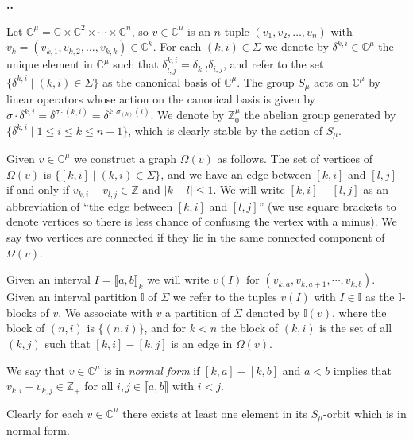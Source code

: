 \documentclass[11pt,fleqn]{amsart}
\renewcommand\thesection{\arabic{section}}
\newcounter{para}[section]
\renewcommand\thepara{\thesection.\arabic{para}}
\def\paragraph{%
 \noindent
 \refstepcounter{para}%
 \textbf{\thepara.}\hspace{1ex}%
}
\newcommand\CC{\mathbb C}
\newcommand\ZZ{\mathbb Z}
\newcommand\II{\mathbb I}
\newcommand\interval[1]{\llbracket #1 \rrbracket}
\newcommand\abs[1]{|#1|}
\begin{document}
\paragraph
Let $\CC^\mu = \CC \times \CC^2 \times \cdots \times \CC^n$, so $v \in \CC^\mu$
is an $n$-tuple $(v_1, v_2, \ldots, v_n)$ with $v_k = (v_{k,1}, v_{k,2},
\ldots, v_{k,k}) \in \CC^k$. For each $(k,i) \in \Sigma$ we denote by 
$\delta^{k,i} \in \CC^\mu$ the unique element in $\CC^\mu$ such that 
$\delta^{k,i}_{l,j} = \delta_{k,l} \delta_{i,j}$, and refer to the set 
$\{\delta^{k,i}\mid (k,i) \in \Sigma\}$ as the canonical basis of $\CC^\mu$. 
The group $S_\mu$ acts on $\CC^\mu$ by linear operators whose action on the 
canonical basis is given by $\sigma \cdot \delta^{k,i} = \delta^{\sigma \cdot 
(k,i)} = \delta^{k, \sigma_{(k)} (i)}$. We denote by $\ZZ^\mu_0$ the abelian 
group generated by $\{\delta^{k,i} \mid 1 \leq i \leq k \leq n-1\}$, which is 
clearly stable by the action of $S_\mu$.

Given $v \in \CC^\mu$ we construct a graph $\Omega(v)$ as follows. The set of 
vertices of $\Omega(v)$ is $\{[k,i] \mid (k,i) \in \Sigma\}$, and we have an 
edge between $[k,i]$ and $[l,j]$ if and only if $v_{k,i} - v_{l,j} \in \ZZ$ 
and $\abs{k-l} \leq 1$. We will write $[k,i] - [l,j]$ as an abbreviation of 
``the edge between $[k,i]$ and $[l,j]$'' (we use square brackets to denote 
vertices so there is less chance of confusing the vertex with a minus). We say 
two vertices are connected if they lie in the same connected component of 
$\Omega(v)$. 

Given an interval $I = \interval{a,b}_k$ we will write $v(I)$ for $(v_{k,a}, 
v_{k,a+1}, \cdots, v_{k,b})$. Given an interval partition $\II$ of $\Sigma$ we 
refer to the tuples $v(I)$ with $I \in \II$ as the $\II$-blocks of $v$. We 
associate with $v$ a partition of $\Sigma$ denoted by $\II(v)$, where the 
block of $(n,i)$ is $\{(n,i)\}$, and for $k < n$ the block of $(k,i)$ is the 
set of all $(k,j)$ such that $[k,i] - [k,j]$ is an edge in $\Omega(v)$.

\begin{Definition}
We say that $v \in \CC^\mu$ is in \emph{normal form} if $[k,a] - [k,b]$
and $a < b$ implies that $v_{k,i} - v_{k,j} \in \ZZ_+$ for all $i,j \in 
\interval{a,b}$ with $i < j$. 
\end{Definition}
Clearly for each $v \in \CC^\mu$ there exists at least one element in its 
$S_\mu$-orbit which is in normal form. 
\end{document}
